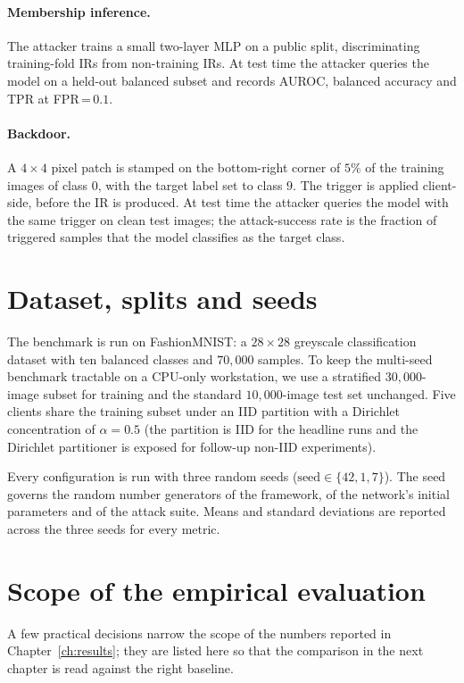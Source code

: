 \documentclass[11pt,a4paper,oneside]{report}
\begin{document}
\paragraph{Membership inference.}
The attacker trains a small two-layer MLP on a public split,
discriminating training-fold IRs from non-training IRs. At test time
the attacker queries the model on a held-out balanced subset and
records AUROC, balanced accuracy and TPR at FPR\,=\,$0.1$.

\paragraph{Backdoor.}
A $4{\times}4$ pixel patch is stamped on the bottom-right corner of
$5\%$ of the training images of class $0$, with the target label set
to class $9$. The trigger is applied client-side, before the IR is
produced. At test time the attacker queries the model with the same
trigger on clean test images; the attack-success rate is the fraction
of triggered samples that the model classifies as the target class.

\section{Dataset, splits and seeds}

The benchmark is run on FashionMNIST: a $28{\times}28$ greyscale
classification dataset with ten balanced classes and $70{,}000$
samples. To keep the multi-seed benchmark tractable on a CPU-only
workstation, we use a stratified $30{,}000$-image subset for training
and the standard $10{,}000$-image test set unchanged. Five clients
share the training subset under an IID partition with a Dirichlet
concentration of $\alpha=0.5$ (the partition is IID for the headline
runs and the Dirichlet partitioner is exposed for follow-up
non-IID experiments).

Every configuration is run with three random seeds
($\text{seed} \in \{42, 1, 7\}$). The seed governs the random number
generators of the framework, of the network's initial parameters and
of the attack suite. Means and standard deviations are reported
across the three seeds for every metric.

\section{Scope of the empirical evaluation}
\label{sec:scope-eval}

A few practical decisions narrow the scope of the numbers reported in
Chapter~\ref{ch:results}; they are listed here so that the comparison
in the next chapter is read against the right baseline.
\end{document}
